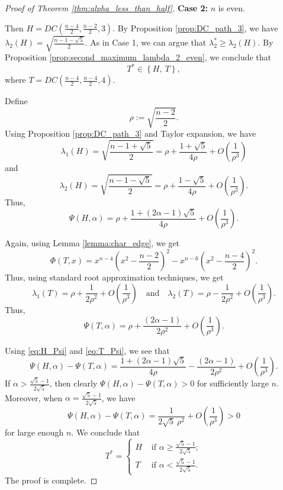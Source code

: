 \documentclass[11pt]{article}
\theoremstyle{plain}
\numberwithin{equation}{section}
\begin{document}
\begin{proof}[Proof of Theorem \ref{thm:alpha_less_than_half}]
\textbf{Case 2:} $n$ is even. 

Then $H =  DC(\frac{n-4}{2}, \frac{n-2}{2}, 3)$. By Proposition \ref{prop:DC_path_3}, we have $\lambda_2(H) = \sqrt{\frac{n-1-\sqrt{5}}{2}}$. As in Case 1, we can argue that $\lambda_2^*\ge \lambda_2(H)$. By Proposition \ref{prop:second_maximum_lambda_2_even}, we conclude that 
\[T^*\in \left\{H, \ T\right\},\] 
where $T = DC(\frac{n-4}{2}, \frac{n-4}{2}, 4)$. 

Define 
\[ \rho := \sqrt{\frac{n-2}{2}}.\]
Using Proposition \ref{prop:DC_path_3} and Taylor expansion, we have 
\[\lambda_1(H)=\sqrt{\frac{n-1+\sqrt{5}}{2}} = \rho + \frac{1+\sqrt{5}}{4\rho} + O\left(\frac{1}{\rho^3}\right)\]
and 
\[\lambda_2(H) = \sqrt{\frac{n-1-\sqrt{5}}{2}} = \rho +  \frac{1 -\sqrt{5}}{4\rho} + O\left(\frac{1}{\rho^3}\right).\]
Thus, 
\begin{equation}\label{eq:H_Psi}
   \Psi(H, \alpha) = \rho + \frac{1+(2\alpha-1) \sqrt{5}}{4\rho} + O\left(\frac{1}{\rho^3}\right). 
\end{equation}

Again, using Lemma \ref{lemma:char_edge}, we get 
\[\Phi(T, x) = x^{n-4}\left( x^2 - \frac{n-2}{2}\right)^2 - x^{n-6}\left( x^2 - \frac{n-4}{2}\right)^2.\]
Thus, using standard root approximation techniques, we get
\[ \lambda_1(T) = \rho + \frac{1}{2\rho^2} + O\left(\frac{1}{\rho^3}\right)\quad \text{and}\quad \lambda_2(T) = \rho - \frac{1}{2\rho^2} + O\left(\frac{1}{\rho^3}\right).\]
Thus, 
\begin{equation}\label{eq:T_Psi}
  \Psi(T,\alpha) = \rho + \frac{(2\alpha-1)}{2\rho^2} + O\left(\frac{1}{\rho^3}\right).  
\end{equation}

Using \eqref{eq:H_Psi} and \eqref{eq:T_Psi}, we see that 
\[ \Psi(H,\alpha) - \Psi(T, \alpha) = \frac{1+(2\alpha-1) \sqrt{5}}{4\rho} - \frac{(2\alpha-1)}{2\rho^2}  +  O\left(\frac{1}{\rho^3}\right). \]
If $\alpha > \frac{\sqrt{5}-1}{2\sqrt{5}}$, then clearly $\Psi(H,\alpha) - \Psi(T, \alpha) > 0$ for sufficiently large $n$. Moreover, when $\alpha = \frac{\sqrt{5}-1}{2\sqrt{5}}$, we have 
\[ \Psi(H,\alpha) - \Psi(T, \alpha) = \frac{1}{2\sqrt{5}\ \rho^2}  +  O\left(\frac{1}{\rho^3}\right)>0\]
for large enough $n$. We conclude that 
\[ T^* = 
\begin{cases}
    H & \text{ if }\alpha \ge \frac{\sqrt{5}-1}{2\sqrt{5}};\\
    T & \text{ if }\alpha < \frac{\sqrt{5}-1}{2\sqrt{5}}.
\end{cases}\]
The proof is complete.
\end{proof}
\end{document}
